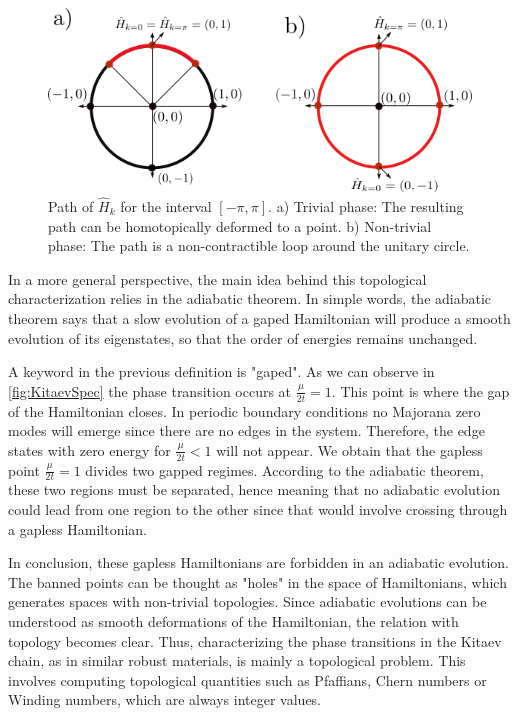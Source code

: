 \begin{figure}[t]
    \centering
    \includegraphics[scale=0.8]{IMAGES/Majorana/Topological.png}
    \caption{ \label{fig:topological}  Path of $\hat{H}_k$ for the interval $[ -\pi, \pi ]$. a) Trivial phase: The resulting path can be homotopically deformed to a point. b) Non-trivial phase: The path is a non-contractible loop around the unitary circle. \protect {}} 
\end{figure}


In a more general perspective, the main idea behind this topological characterization relies in the adiabatic theorem.  In simple words, the adiabatic theorem says that a slow evolution of a gaped Hamiltonian will produce a smooth evolution of its  eigenstates, so that the order of energies remains unchanged. 

A keyword in the previous definition is "gaped". As we can observe in  \ref{fig:KitaevSpec} the phase transition occurs at $\frac{\mu}{2t}=1$. This point is where  the gap of the Hamiltonian closes. In periodic boundary conditions no Majorana zero modes will emerge since there are no edges in the system. Therefore, the edge states with zero energy for $\frac{\mu}{2t}<1$ will not appear. We obtain that the gapless point $\frac{\mu}{2t}=1$ divides two gapped regimes. According to the adiabatic theorem, these two regions must be separated, hence meaning that no adiabatic evolution could lead from one region to the other since that would involve crossing  through a gapless Hamiltonian. 


In conclusion, these gapless Hamiltonians are forbidden in an adiabatic evolution. The banned points can be thought as "holes" in the space of Hamiltonians, which generates spaces with non-trivial topologies. Since adiabatic evolutions can be understood as smooth deformations of the Hamiltonian, the relation with topology becomes clear.  Thus, characterizing the phase transitions in the Kitaev chain, as in similar robust materials,  is mainly a topological problem. This involves computing topological quantities such as Pfaffians, Chern numbers or Winding numbers, which are always integer values. 

